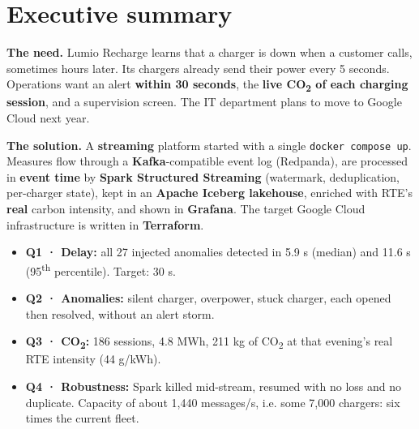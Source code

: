 \documentclass[11pt, a4paper, oneside, headings=normal, numbers=noenddot, DIV=12]{scrartcl}
\begin{document}
\begingroup
{}
\setcounter{tocdepth}{2}
\tableofcontents
\endgroup
\clearpage

\section{Executive summary}\label{sec:summary}

\textbf{The need.} Lumio Recharge learns that a charger is down when a customer calls, sometimes hours later. Its chargers already send their
power every 5 seconds. Operations want an alert \textbf{within 30 seconds}, the \textbf{live CO\textsubscript{2} of each charging session}, and a
supervision screen. The IT department plans to move to Google Cloud next year.

\textbf{The solution.} A \textbf{streaming} platform started with a single \texttt{docker compose up}. Measures flow through a
\textbf{Kafka}-compatible event log (Redpanda), are processed in \textbf{event time} by \textbf{Spark Structured Streaming} (watermark,
deduplication, per-charger state), kept in an \textbf{Apache Iceberg lakehouse}, enriched with RTE's \textbf{real} carbon intensity, and shown in
\textbf{Grafana}. The target Google Cloud infrastructure is written in \textbf{Terraform}.


\begin{keybox}
\begin{itemize}[leftmargin=1.2em]
  \item \textbf{Q1 · Delay:} all 27 injected anomalies detected in 5.9 s (median) and 11.6 s (95\textsuperscript{th} percentile). Target: 30 s.
  \item \textbf{Q2 · Anomalies:} silent charger, overpower, stuck charger, each opened then resolved, without an alert storm.
  \item \textbf{Q3 · CO\textsubscript{2}:} 186 sessions, 4.8 MWh, 211 kg of CO\textsubscript{2} at that evening's real RTE intensity (44 g/kWh).
  \item \textbf{Q4 · Robustness:} Spark killed mid-stream, resumed with no loss and no duplicate. Capacity of about 1,440 messages/s, i.e.
        some 7,000 chargers: six times the current fleet.
\end{itemize}
\end{keybox}
\end{document}
